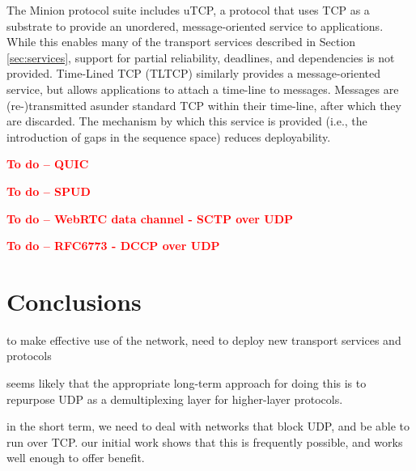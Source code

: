 \documentclass{sig-alternate-05-2015}
\newcommand{\todo}[1]{\textbf{\textcolor{red}{To do -- #1}}}
\begin{document}
The Minion protocol suite \cite{nowlan:2012:minion} includes uTCP, a
protocol that uses TCP as a substrate to provide an unordered,
message-oriented service to applications. While this enables many of
the transport services described in Section \ref{sec:services}, support for
partial reliability, deadlines, and dependencies is not provided. 
Time-Lined TCP (TLTCP) \cite{mukherjee:2000:timelines} similarly provides a
message-oriented service, but allows applications to attach a time-line
to messages. Messages are (re-)transmitted asunder standard TCP within
their time-line, after which they are discarded. The mechanism by which
this service is provided (i.e., the introduction of gaps in the sequence
space) reduces deployability.

\todo{QUIC}

\todo{SPUD}

\todo{WebRTC data channel - SCTP over UDP}

\todo{RFC6773 - DCCP over UDP}


\section{Conclusions}
\label{sec:conclusions}

to make effective use of the network, need to deploy new transport services
and protocols

seems likely that the appropriate long-term approach for doing this is to
repurpose UDP as a demultiplexing layer for higher-layer protocols. 

in the short term, we need to deal with networks that block UDP, and be
able to run over TCP.
our initial work shows that this is frequently possible, and works well
enough to offer benefit.





\end{document}
